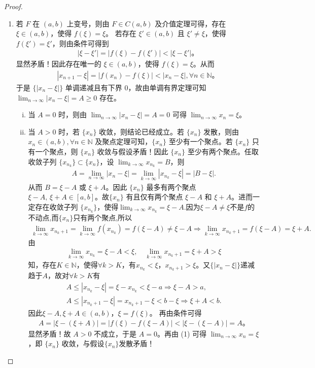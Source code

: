 \documentclass[../../main.tex]{subfiles}
\begin{document}
\begin{proof}
\begin{enumerate}[(1)]
\item 若 $F$ 在 $(a, b)$ 上变号，则由 $F \in C(a, b)$ 及介值定理可得，存在 $\xi \in (a, b)$，使得 $f(\xi) = \xi$。
若存在 $\xi' \in (a, b)$ 且 $\xi' \neq \xi$，使得 $f(\xi') = \xi'$，则由条件可得到
\begin{align*}
|\xi - \xi'| = |f(\xi) - f(\xi')| < |\xi - \xi'|。
\end{align*}
显然矛盾！因此存在唯一的 $\xi \in (a, b)$，使得 $f(\xi) = \xi$。从而
\begin{align*}
|x_{n+1} - \xi| = |f(x_n) - f(\xi)| < |x_n - \xi|, \forall n \in \mathbb{N}。
\end{align*}
于是 $\{|x_n - \xi|\}$ 单调递减且有下界 $0$，故由单调有界定理可知 $\lim_{n \to \infty} |x_n - \xi| = A \geqslant 0$ 存在。
\begin{enumerate}[(i)]
\item 当 $A = 0$ 时，则由 $\lim_{n \to \infty} |x_n - \xi| = A = 0$ 可得 $\lim_{n \to \infty} x_n = \xi$。
\item 当 $A > 0$ 时，若 $\{x_n\}$ 收敛，则结论已经成立。若 $\{x_n\}$ 发散，则由 $x_n \in (a, b), \forall n \in \mathbb{N}$ 及聚点定理可知，$\{x_n\}$ 至少有一个聚点。若 $\{x_n\}$ 只有一个聚点，则 $\{x_n\}$ 收敛与假设矛盾！因此 $\{x_n\}$ 至少有两个聚点。任取收敛子列 $\{x_{n_k}\} \subset \{x_n\}$，设 $\lim_{k \to \infty} x_{n_k} = B$，则
\begin{align*}
A=\lim_{n\rightarrow \infty} |x_n-\xi |=\lim_{k\rightarrow \infty} |x_{n_k}-\xi |=|B-\xi |.
\end{align*}
从而 $B = \xi - A$ 或 $\xi + A$。因此 $\{x_n\}$ 最多有两个聚点 $\xi - A,\,\xi + A\in [a,b]$。故$\{x_n\}$ 有且仅有两个聚点 $\xi - A$ 和 $\xi + A$。进而一定存在收敛子列 $\{x_{n_k}\}$，使得$\lim_{k \to \infty} x_{n_k} = \xi - A.$因为$\xi-A\ne \xi$不是$f$的不动点,而$\{x_n\}$只有两个聚点,所以
\begin{align*}
\lim_{k\rightarrow \infty} x_{n_k+1}=\lim_{k\rightarrow \infty} f\left( x_{n_k} \right) =f\left( \xi -A \right) \ne \xi -A\Longrightarrow \lim_{k\rightarrow \infty} x_{n_k+1}=f(\xi -A)=\xi +A.
\end{align*}
由
\begin{align*}
\lim_{k\rightarrow \infty}x_{n_k}=\xi -A<\xi ,\quad \lim_{k\rightarrow \infty}x_{n_k+1}=\xi +A>\xi 
\end{align*}
知，存在$K\in \mathbb{N}$，使得$\forall k>K$，有$x_{n_k}<\xi$，$x_{n_k+1}>\xi$。又$\{| x_n-\xi |\}$递减趋于$A$，故对$\forall k>K$有
\begin{gather*}
A\leqslant | x_{n_k}-\xi |=\xi -x_{n_k}<\xi -a\Longrightarrow \xi -A>a,
\\
A\leqslant | x_{n_k+1}-\xi |=x_{n_k+1}-\xi <b-\xi \Longrightarrow \xi +A<b.
\end{gather*}
因此$\xi -A,\xi +A\in (a,b)$，$\xi =f(\xi)$。
再由条件可得
\begin{align*}
A = |\xi - (\xi + A)| = |f(\xi) - f(\xi - A)| < |\xi - (\xi - A)| = A。
\end{align*}
显然矛盾！故 $A > 0$ 不成立，于是 $A = 0$。再由 (1) 可得 $\lim_{n \to \infty} x_n = \xi$，即 $\{x_n\}$ 收敛，与假设$\{x_n\}$发散矛盾！
\end{enumerate}
\end{enumerate}


\end{proof}
\end{document}
